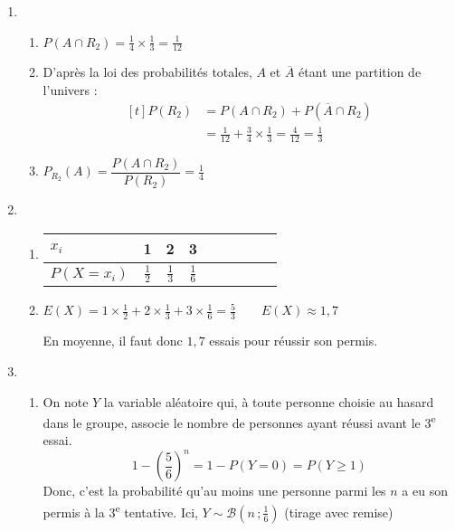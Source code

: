 \documentclass{scrartcl}
\begin{document}
\begin{adjustwidth}{2em}{0pt}
\begin{enumerate}
            \item   \begin{enumerate}[label=\alph*)]
                        \item	$P(A\cap R_2)=\frac{1}{4}\times\frac{1}{3}=\boxed{\frac{1}{12}}$
                        \item   D'après la loi des probabilités totales, $A$ et $\overline{A}$ étant une partition de l'univers : 
                                \[\begin{aligned}[t]
                                    P(R_2)&=P(A\cap R_2)+P(\overline{A}\cap R_2) \\
                                    &=\frac{1}{12}+\frac{3}{4}\times\frac{1}{3}=\frac{4}{12}=\boxed{\frac{1}{3}}
                                \end{aligned}\]
                        \item   $P_{R_2}(A)=\dfrac{P(A\cap R_2)}{P(R_2)}=\boxed{\frac{1}{4}}$
                    \end{enumerate}
                    
            \item   \begin{enumerate}[label=\alph*)]
                        \item  \hfill\begin{tabular}[t]{ | l || *{8}{c| } } \firsthline
                                    $x_i$                     & 1             & 2             & 3               \\ \hline
                                    $P(X=x_i)$ \hspace{0.5cm} & $\frac{1}{2}$ & $\frac{1}{3}$ & $\frac{1}{6}$   \\ \hline
                                \end{tabular}\hfill\mbox{}
                                \parbox{\linewidth}{}  
                        \item   $E(X)=1\times\frac{1}{2}+2\times\frac{1}{3}+3\times\frac{1}{6}=\frac{5}{3}\qquad\boxed{E(X)\approx 1{,}7}$ \par
                                En moyenne, il faut donc $1{,}7$ essais pour réussir son permis.
                    \end{enumerate}
            \item   \begin{enumerate}[label=\alph*)]
                        \item   On note $Y$ la variable aléatoire qui, à toute personne choisie au hasard dans le groupe, associe le nombre de personnes ayant réussi avant le 3\textsuperscript{e} essai.
                        \[1-\left(\frac{5}{6}\right)^n=1-P(Y=0)=\boxed{P(Y\geq 1)}\] 
                        Donc, c'est la probabilité qu'au moins une personne parmi les $n$ a eu son permis à la 3\textsuperscript{e} tentative. Ici, $Y\sim\mathcal{B}\left(n\,;\frac{1}{6}\right)$ (tirage avec remise)


\end{enumerate}
\end{enumerate}
\end{adjustwidth}
\end{document}
